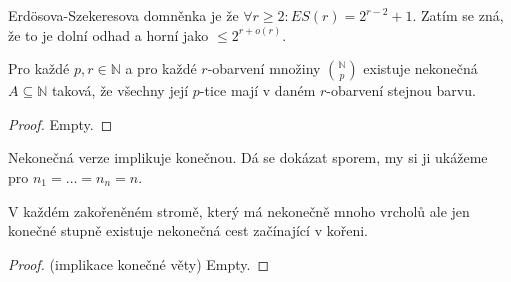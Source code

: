 Erdösova-Szekeresova domněnka je že $\forall r \geq 2: ES(r) = 2^{r-2}+1$. Zatím se zná, že to je dolní odhad a horní jako $\leq 2^{r+o(r)}$.

\begin{veta}
	Pro každé $p,r \in \mathbb{N}$ a pro každé $r$-obarvení množiny $\binom{\mathbb{N}}{p}$ existuje nekonečná $A \subseteq \mathbb{N}$ taková, že všechny její $p$-tice mají v daném $r$-obarvení stejnou barvu.
\end{veta}

\begin{proof}
	Empty.
\end{proof}

Nekonečná verze implikuje konečnou. Dá se dokázat sporem, my si ji ukážeme pro $n_{1} = \dots = n_{n} = n$.

\begin{lemma}
	V každém zakořeněném stromě, který má nekonečně mnoho vrcholů ale jen konečné stupně existuje nekonečná cest začínající v kořeni.
\end{lemma}

\begin{proof}(implikace konečné věty)
	Empty.
\end{proof}
